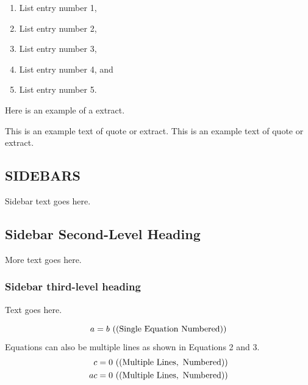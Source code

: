 \documentclass[a4paper]{ar-1col}
\begin{document}
\begin{enumerate}
\item List entry number 1,
\item List entry number 2,
\item List entry number 3,\item List entry number 4, and
\item List entry number 5.
\end{enumerate}

Here is an example of a extract.
\begin{extract}
This is an example text of quote or extract.
This is an example text of quote or extract.
\end{extract}

\begin{marginnote}[]
\end{marginnote}

\begin{textbox}[h]\section{SIDEBARS}
Sidebar text goes here.
\subsection{Sidebar Second-Level Heading}
More text goes here.\subsubsection{Sidebar third-level heading}
Text goes here.\end{textbox}



\begin{equation}
a = b \ {\rm ((Single\ Equation\ Numbered))}
\end{equation}
Equations can also be multiple lines as shown in Equations 2 and 3.
\begin{eqnarray}
c = 0 \ {\rm ((Multiple\  Lines, \ Numbered))}\\
ac = 0 \ {\rm ((Multiple \ Lines, \ Numbered))}
\end{eqnarray}
\end{document}
